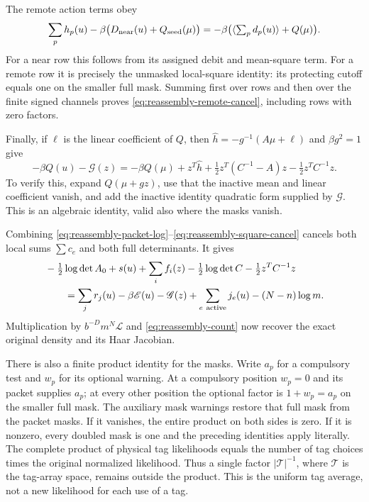 The remote action terms obey
\begin{equation}\label{eq:reassembly-remote-cancel}
 \sum_p h_p(u)-\beta\bigl(D_{\rm near}(u)+Q_{\rm seed}(\mu)\bigr)
       =-\beta\bigl(\langle\textstyle\sum_pd_p(u)\rangle+Q(\mu)\bigr).
\end{equation}
For a near row this follows from its assigned debit and mean-square
term. For a remote row it is precisely the unmasked local-square
identity: its protecting cutoff equals one on the smaller full mask.
Summing first over rows and then over the finite signed channels proves
\eqref{eq:reassembly-remote-cancel}, including rows with zero factors.

Finally, if $\ell$ is the linear coefficient of $Q$, then
$\widehat h=-g^{-1}(A\mu+\ell)$ and $\beta g^2=1$ give
\begin{equation}\label{eq:reassembly-square-cancel}
 -\beta Q(u)-\mathscr G(z)
 =-\beta Q(\mu)+z^T\widehat h
     +\tfrac12z^T(C^{-1}-A)z-\tfrac12z^TC^{-1}z.
\end{equation}
To verify this, expand $Q(\mu+gz)$, use that the inactive mean and
linear coefficient vanish, and add the inactive identity quadratic
form supplied by $\mathscr G$. This is an algebraic identity, valid
also where the masks vanish.

Combining \eqref{eq:reassembly-packet-log}--\eqref{eq:reassembly-square-cancel}
cancels both local sums $\sum c_e$ and both full determinants. It gives
\begin{align}
 &-\tfrac12\log\det A_0+s(u)+\sum_i f_i(z)
             -\tfrac12\log\det C-\tfrac12z^TC^{-1}z\nonumber\\
 &\qquad=\sum_jr_j(u)-\beta\mathscr E(u)-\mathscr G(z)
          +\sum_{e\ {\rm active}}j_e(u)-(N-n)\log m.
                                                    \label{eq:reassembly-exponents}
\end{align}
Multiplication by $b^{-D}m^N\mathscr L$ and
\eqref{eq:reassembly-count} now recover the exact original density
and its Haar Jacobian.

There is also a finite product identity for the masks. Write $a_p$
for a compulsory test and $w_p$ for its optional warning. At a
compulsory position $w_p=0$ and its packet supplies $a_p$; at every
other position the optional factor is $1+w_p=a_p$ on the smaller
full mask. The auxiliary mask warnings restore that full mask from
the packet masks. If it vanishes, the entire product on both sides
is zero. If it is nonzero, every doubled mask is one and the preceding
identities apply literally. The complete product of physical tag
likelihoods equals the number of tag choices times the original
normalized likelihood. Thus a single factor $|\mathcal T|^{-1}$,
where $\mathcal T$ is the tag-array space, remains outside the product.
This is the uniform tag average, not a new likelihood for each use
of a tag.

